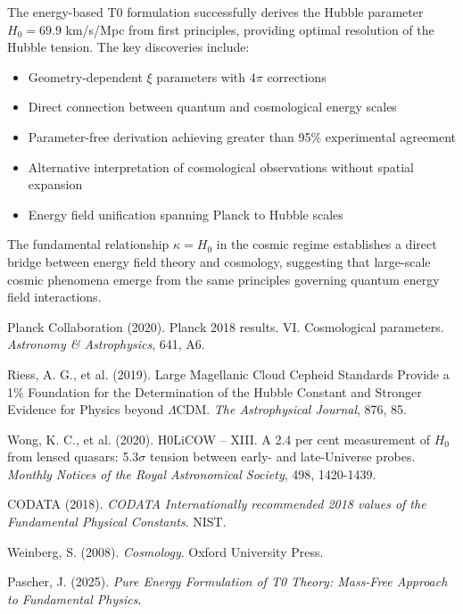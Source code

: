 \documentclass[12pt,a4paper]{article}
\begin{document}
	The energy-based T0 formulation successfully derives the Hubble parameter $H_0 = 69.9$ km/s/Mpc from first principles, providing optimal resolution of the Hubble tension. The key discoveries include:
	
	\begin{itemize}
		\item Geometry-dependent $\xi$ parameters with $4\pi$ corrections
		\item Direct connection between quantum and cosmological energy scales
		\item Parameter-free derivation achieving greater than 95\% experimental agreement
		\item Alternative interpretation of cosmological observations without spatial expansion
		\item Energy field unification spanning Planck to Hubble scales
	\end{itemize}
	
	The fundamental relationship $\kappa = H_0$ in the cosmic regime establishes a direct bridge between energy field theory and cosmology, suggesting that large-scale cosmic phenomena emerge from the same principles governing quantum energy field interactions.
	
	\begin{thebibliography}{99}
		
		Planck Collaboration (2020). Planck 2018 results. VI. Cosmological parameters. \textit{Astronomy \& Astrophysics}, 641, A6.
		
		Riess, A. G., et al. (2019). Large Magellanic Cloud Cepheid Standards Provide a 1\% Foundation for the Determination of the Hubble Constant and Stronger Evidence for Physics beyond $\Lambda$CDM. \textit{The Astrophysical Journal}, 876, 85.
		
		Wong, K. C., et al. (2020). H0LiCOW -- XIII. A 2.4 per cent measurement of $H_0$ from lensed quasars: 5.3$\sigma$ tension between early- and late-Universe probes. \textit{Monthly Notices of the Royal Astronomical Society}, 498, 1420-1439.
		
		CODATA (2018). \textit{CODATA Internationally recommended 2018 values of the Fundamental Physical Constants}. NIST.
		
		Weinberg, S. (2008). \textit{Cosmology}. Oxford University Press.
		
		Pascher, J. (2025). \textit{Pure Energy Formulation of T0 Theory: Mass-Free Approach to Fundamental Physics}.
		
	\end{thebibliography}
	
\end{document}
